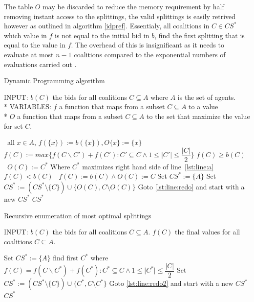 \documentclass{aamas2012}
\begin{document}
The table $O$ may be discarded to reduce the memory requirement by half removing instant access to the splittings,
the valid splittings is easily retrived however as outlined in algorithm \ref{idpref}. Essentialy, all coalitions in $C \in CS^*$ which value in $f$
is not equal to the initial bid in $b$, find the first splitting that is equal to the value in $f$.
The overhead of this is insignificant as it needs to evaluate at most $n -1$ coalitions compared to the exponential
numbers of evaluations carried out \cite{eps265062}.

\begin{algorithm}
\caption{Dynamic Programming algorithm \label{DP}}
INPUT: $b(C)$ the bids for all coalitions $C \subseteq A$ where $A$ is the set of agents.\\*
VARIABLES: $f$ a function that maps from a subset $C \subseteq A$ to a value\\*
$O$ a function that maps from a subset $C \subseteq A$ to the set that maximize the value for set $C$.
\begin{algorithmic}[1]
\STATE\algorithmicfor\ all $x \in A$, \algorithmicdo $f(\{x\}):= b(\{x\}),O\{x\}:= \{x\}$ \algorithmicendfor
{}
\STATE $f(C) := max\{f(C\backslash C')+f(C'):C'\subseteq C \wedge 1 \leq \vert C' \vert \leq \dfrac{\vert C \vert}{2}\}$ \label{lst:line:a}
\STATE\algorithmicif $f(C) \geq b(C)$ \algorithmicthen\ $O(C) := C^{*}$ \hfill Where $C^{*}$ maximizes right hand side of line~\ref{lst:line:a} \algorithmicendif
\STATE\algorithmicif $f(C) < b(C)$ \algorithmicthen\ $f(C) := b(C)\wedge O(C) := C$ \algorithmicendif
\ENDFOR
\ENDFOR
\STATE Set $CS^* := \{A\}$
 \label{lst:line:redo}
\STATE Set $CS^* := (CS^*\setminus \{C\})\cup \{O(C),C\setminus O(C)\}$ 
\STATE Goto \ref{lst:line:redo} and start with a new $CS^*$
\ENDIF
\ENDFOR
\RETURN $CS^*$
\end{algorithmic}
\end{algorithm}

\begin{algorithm}
\caption{Recursive enumeration of most optimal splittings \label{idpref}}
INPUT: $b(C)$ the bids for all coalitions $C \subseteq A$.
$f(C)$ the final values for all coalitions $C \subseteq A$.
\begin{algorithmic}[1]
\STATE Set $CS^* := \{A\}$
 \label{lst:line:redo2}
\STATE find first $C^*$ where $f(C) = f(C\backslash C^*)+f(C^*):C^*\subseteq C \wedge 1 \leq \vert C^* \vert \leq \dfrac{\vert C \vert}{2}$ \label{lst:line:aa}
\STATE Set $CS^* := (CS^*\setminus \{C\})\cup \{C^*,C\setminus C^*\}$
\STATE Goto \ref{lst:line:redo2} and start with a new $CS^*$
\ENDIF
\ENDFOR
\RETURN $CS^*$
\end{algorithmic}
\end{algorithm}
\end{document}
